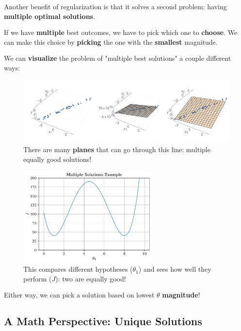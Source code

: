         Another benefit of regularization is that it solves a second problem: having \textbf{multiple optimal solutions}.
        
        If we have \textbf{multiple} best outcomes, we have to pick which one to \textbf{choose}. We can make this choice by \textbf{picking} the one with the \textbf{smallest} magnitude.
        
        We can \textbf{visualize} the problem of "multiple best solutions" a couple different ways:
        
        \begin{figure}[H]
        \centering
            \includegraphics[width=120mm,scale=0.5]{images/regression_images/Regularizer_Multiple_Solutions.png}
        
            \caption*{There are many \textbf{planes} that can go through this line: multiple equally good solutions!}
        \end{figure}
        
        \begin{figure}[H]
        \centering
            \includegraphics[width=70mm,scale=0.5]{images/regression_images/Regression_Multiple_Solutions_Example.png}
        
            \caption*{This compares different hypotheses ($\theta_1$) and sees how well they perform ($J$): two are equally good!}
        \end{figure}
        
        Either way, we can pick a solution based on lowest $\theta$ \textbf{magnitude}!
        
    \subsection{A Math Perspective: Unique Solutions}    
        
